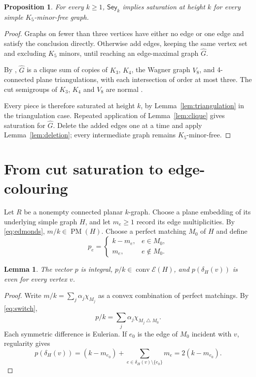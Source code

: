 \documentclass[10pt]{article}
\newtheorem{lemma}[theorem]{Lemma}
\newtheorem{proposition}[theorem]{Proposition}
\theoremstyle{definition}
\theoremstyle{remark}
\DeclareMathOperator{\conv}{conv}
\DeclareMathOperator{\PM}{PM}
\newcommand{\EC}{\mathcal E}
\newcommand{\symd}{\mathbin{\triangle}}
\begin{document}
\begin{proposition}\label{prop:forward}
For every $k\geq1$, $\mathsf{Sey}_k$ implies saturation at height $k$ for every simple $K_5$-minor-free graph.
\end{proposition}
\begin{proof}
Graphs on fewer than three vertices have either no edge or one edge and satisfy the conclusion directly.
Otherwise add edges, keeping the same vertex set and excluding $K_5$ minors, until reaching an edge-maximal graph $\widehat G$.

By \cite[Proposition~4.1]{Ohsugi}, $\widehat G$ is a clique sum of copies of $K_3$, $K_4$, the Wagner graph $V_8$, and 4-connected plane triangulations, with each intersection of order at most three.
The cut semigroups of $K_3$, $K_4$ and $V_8$ are normal \cite[Section~4, Example~4.2]{Ohsugi}.

Every piece is therefore saturated at height $k$, by Lemma~\ref{lem:triangulation} in the triangulation case.
Repeated application of Lemma~\ref{lem:clique} gives saturation for $\widehat G$.
Delete the added edges one at a time and apply Lemma~\ref{lem:deletion}; every intermediate graph remains $K_5$-minor-free.
\end{proof}

\section{From cut saturation to edge-colouring}\label{sec:reverse}
Let $R$ be a nonempty connected planar $k$-graph.
Choose a plane embedding of its underlying simple graph $H$, and let $m_e\geq1$ record its edge multiplicities.
By \eqref{eq:edmonds}, $m/k\in\PM(H)$.
Choose a perfect matching $M_0$ of $H$ and define
\begin{equation}\label{eq:switch}
 p_e=\begin{cases}k-m_e,&e\in M_0,\\m_e,&e\notin M_0.\end{cases}
\end{equation}

\begin{lemma}\label{lem:switch}
The vector $p$ is integral, $p/k\in\conv\EC(H)$, and $p(\delta_H(v))$ is even for every vertex $v$.
\end{lemma}
\begin{proof}
Write $m/k=\sum_j\alpha_j\chi_{M_j}$ as a convex combination of perfect matchings.
By \eqref{eq:switch},
\[
 p/k=\sum_j\alpha_j\chi_{M_j\symd M_0}.
\]
Each symmetric difference is Eulerian.
If $e_0$ is the edge of $M_0$ incident with $v$, regularity gives
\[
 p(\delta_H(v))=(k-m_{e_0})+\sum_{e\in\delta_H(v)\setminus\{e_0\}}m_e
 =2(k-m_{e_0}).
\]
\end{proof}
\end{document}
